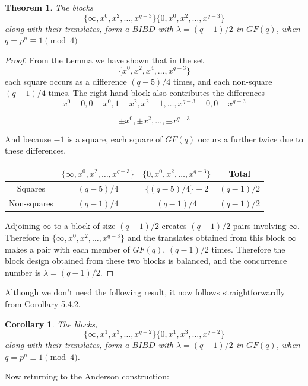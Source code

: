 \documentclass[
  11pt,
  a4paper]{book}
\newtheorem{theorem}{Theorem}
\newtheorem{corollary}{Corollary}[theorem]
\begin{document}
\begin{theorem}
The blocks
$$\{\infty, x^0, x^2, \ldots, x^{q - 3}\}\{0, x^0, x^2, \ldots, x^{q - 3}\}$$
along with their translates, form a $BIBD$ with
$\lambda = (q - 1)/2$ in $GF(q)$, when
$q = p^n \equiv 1\pmod 4$
\end{theorem}

\begin{proof}
From the Lemma we have shown that in the set
$$\{x^0, x^2, x^4, \ldots, x^{q - 3}\}$$ each square
occurs as a difference
$(q - 5)/4$ times, and each non-square $(q-1)/4$ times.
The right hand block also contributes the differences
$$x^0 - 0, 0 - x^0, 1 - x^2, x^2 - 1, \ldots, x^{q - 3} - 0, 0 - x^{q - 3}$$

$$\pm x^0, \pm x^2, \ldots ,\pm x^{q-3}$$

And because $-1$ is a square, each square of $GF(q)$ occurs
a further twice due to these differences.

\begin{tabular}{c|ccc}
               & $\{\infty, x^0, x^2, \ldots, x^{q - 3}\}$ & $\{0, x^0, x^2, \ldots,x^{q - 3}\}$ &   Total     \\ \hline
     Squares   &               $(q - 5)/4$                 &         $\{(q - 5)/4\} + 2$         & $(q - 1)/2$ \\
   Non-squares &               $(q - 1)/4$                 &              $(q - 1)/4$            & $(q - 1)/2$ \\
\end{tabular}

Adjoining $\infty$ to a block of size $(q - 1)/2$ creates
$(q - 1)/2$ pairs involving $\infty$. Therefore in
$\{\infty, x^0, x^2, \ldots, x^{q - 3}\}$ and the translates
obtained from this block $\infty$ makes a pair with each
member of $GF(q)$, $(q - 1)/2$ times.  Therefore the block
design obtained from these two blocks is balanced, and the
concurrence number is $\lambda = (q - 1)/2$.
\end{proof}

Although we don't need the following result, it now follows
straightforwardly from Corollary 5.4.2.

\begin{corollary}
The blocks,
$$\{\infty, x^1, x^3, \ldots, x^{q - 2}\}\{0, x^1, x^3, \ldots, x^{q - 2}\}$$
along with their translates, form a $BIBD$ with
$\lambda = (q - 1)/2$ in $GF(q)$, when
$q = p^n \equiv 1\pmod 4$.
\end{corollary}

Now returning to the Anderson construction:
\end{document}
